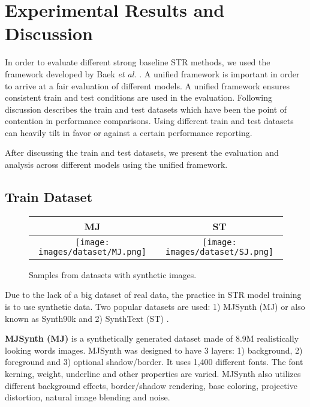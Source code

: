 \documentclass[runningheads]{llncs}
\begin{document}
\section{Experimental Results and Discussion}

In order to evaluate different strong baseline STR methods, we used the framework developed by Baek \textit{et al.} \cite{baek2019wrong}. A unified framework is important in order to arrive at a fair evaluation of different models. A unified framework ensures consistent train and test conditions are used in the evaluation. Following discussion describes the train and test datasets which have been the point of contention in performance comparisons. Using different train and test datasets can heavily tilt in favor or against a certain performance reporting.

After discussing the train and test datasets, we present the evaluation and analysis across different models using the unified framework. 

\subsection{Train Dataset}



\begin{figure}
    \centering
\begin{tabular}{| c | c  |}
\hline
MJ & ST \\
\hline
\texttt{[image: images/dataset/MJ.png]} & \texttt{[image: images/dataset/SJ.png]} \\
\hline

\end{tabular}    
    \caption{Samples from datasets with synthetic images.}
    \label{fig:synth_dataset}
\end{figure}


Due to the lack of a big dataset of real data, the practice in STR model training is to use synthetic data. Two popular datasets are used: 1) MJSynth (MJ) \cite{jaderberg2014synthetic} or also known as Synth90k and 2) SynthText (ST) \cite{gupta2016synthetic}. 

\textbf{MJSynth (MJ)} is a synthetically generated dataset made of 8.9M realistically looking  words images. MJSynth was designed to have 3 layers: 1) background, 2) foreground and 3) optional shadow/border. It uses 1,400 different fonts. The font kerning, weight, underline and other properties are varied. MJSynth also utilizes different background effects, border/shadow rendering, base coloring, projective distortion, natural image blending and noise.
\end{document}
